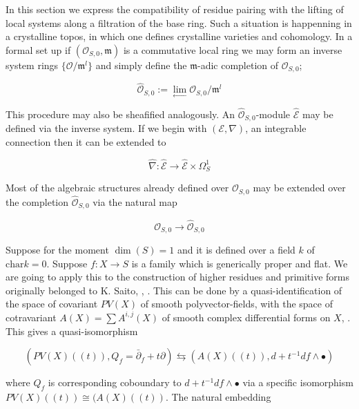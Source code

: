 \documentclass[12pt,twoside]{amsart}
\begin{document}
In this section we express the compatibility of residue pairing with the lifting of local systems along a filtration of the base ring. Such a situation is happenning in a crystalline topos, in which one defines crystalline varieties and cohomology. In a formal set up if $(\mathcal{O}_{S,0},\mathfrak{m})$ is a commutative local ring we may form an inverse system rings $\{\mathcal{O}/\mathfrak{m}^l\}$ and simply define the $\mathfrak{m}$-adic completion of $\mathcal{O}_{S,0}$;

\[ \hat{\mathcal{O}}_{S,0}:=\displaystyle{\lim_{\leftarrow}\mathcal{O}_{S,0}}/\mathfrak{m}^l \]

\vspace{0.5cm}

\noindent
This procedure may also be sheafified analogously. An $\hat{\mathcal{O}}_{S,0}$-module $\hat{\mathcal{E}}$ may be defined via the inverse system. If we begin with $(\mathcal{E}, \nabla)$, an integrable connection 
then it can be extended to

\[ \hat{\nabla}:\hat{\mathcal{E}} \to \hat{\mathcal{E}} \times \Omega_S^1 \]

\vspace{0.5cm}

\noindent
Most of the algebraic structures already defined over $\mathcal{O}_{S,0}$ may be extended over the completion $\hat{\mathcal{O}}_{S,0}$ via the natural map 

\[ \mathcal{O}_{S,0} \to \hat{\mathcal{O}}_{S,0} \]

\vspace{0.5cm}

\noindent
Suppose for the moment $\dim(S)=1$ and it is defined over a field $k$ of $\text{char}k=0$. Suppose $f:X \to S$ is a family which is generically proper and flat. We are going to apply this to the construction of higher residues and primitive forms originally belonged to K. Saito, \cite{SA1}, \cite{LLS}. This can be done by a quasi-identification of the space of covariant $PV(X)$ of smooth polyvector-fields, with the space of cotravariant $A(X)=\sum A^{i,j}(X)$ of smooth complex differential forms on $X$, \cite{LLS}. This gives a quasi-isomorphism 

\[ (PV(X)((t)), Q_f=\bar{\partial}_f+t\partial) \leftrightarrows (A(X)((t)), d+t^{-1}df \wedge \bullet) \]

\vspace{0.5cm}

\noindent
where $Q_f$ is corresponding coboundary to $d+t^{-1}df \wedge \bullet$ via a specific  isomorphism $PV(X)((t)) \cong (A(X)((t))$. The natural embedding 
\end{document}

